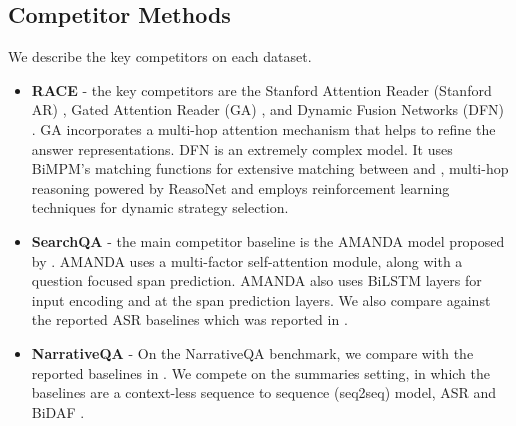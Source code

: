 \documentclass{article}
\begin{document}
\subsection{Competitor Methods}
We describe the key competitors on each dataset. 
\begin{itemize}
\item \textbf{RACE} - the key competitors are the Stanford Attention Reader (Stanford AR) \cite{chen2016thorough}, Gated Attention Reader (GA) \cite{dhingra2016gated}, and Dynamic Fusion Networks (DFN) \cite{xu2017towards}. GA incorporates a multi-hop attention mechanism that helps to refine the answer representations. DFN is an extremely complex model. It uses BiMPM's matching functions \cite{DBLP:conf/ijcai/WangHF17} for extensive matching between  and , multi-hop reasoning powered by ReasoNet \cite{shen2017reasonet} and employs reinforcement learning techniques for dynamic strategy selection.



\item \textbf{SearchQA} - the main competitor baseline is the AMANDA model proposed by \cite{kundu2018amanda}. AMANDA uses a multi-factor self-attention module, along with a question focused span prediction. AMANDA also uses BiLSTM layers for input encoding and at the span prediction layers. We also compare against the reported ASR \cite{kadlec2016text}  baselines which was reported in \cite{dunn2017searchqa}. 

\item \textbf{NarrativeQA} - On the NarrativeQA benchmark, we compare with the reported baselines in \cite{kovcisky2017narrativeqa}. We compete on the summaries setting, in which the baselines are a context-less sequence to sequence (seq2seq) model, ASR \cite{kadlec2016text} and BiDAF \cite{seo2016bidirectional}. 
\end{itemize}
\end{document}
